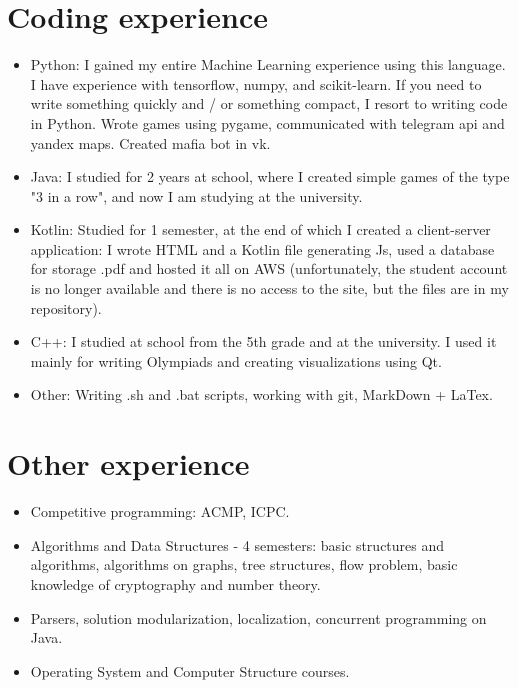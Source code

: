 \documentclass[letter]{deedy-resume}
\begin{document}
    \begin{minipage}[t]{0.6\textwidth}

        \section{Coding experience}

        \begin{itemize}[leftmargin=1em]
            \setlength\itemsep{0em}
            \item Python: I gained my entire Machine Learning experience using this language.
            I have experience with tensorflow, numpy, and scikit-learn.
            If you need to write something quickly and / or something compact, I resort to writing code in Python.
            Wrote games using pygame, communicated with telegram api and yandex maps.
            Created mafia bot in vk.
            \item Java: I studied for 2 years at school, where I created simple games of the type "3 in a row",
            and now I am studying at the university.
            \item Kotlin: Studied for 1 semester, at the end of which I created a client-server application:
            I wrote HTML and a Kotlin file generating Js, used a database for storage .pdf and hosted it all on AWS
            (unfortunately, the student account is no longer available and there is no access to the site,
            but the files are in my repository).
            \item C++: I studied at school from the 5th grade and at the university.
            I used it mainly for writing Olympiads and creating visualizations using Qt.
            \item Other: Writing .sh and .bat scripts, working with git, MarkDown + LaTex.
        \end{itemize}

        \sectionspace %


        \section{Other experience}

        \begin{itemize}[leftmargin=1em]
            \setlength\itemsep{0em}
            \item Competitive programming: ACMP,  ICPC.
            \item Algorithms and Data Structures - 4 semesters: basic structures and algorithms,
            algorithms on graphs, tree structures, flow problem, basic knowledge of cryptography and number theory.
            \item Parsers, solution modularization, localization, concurrent programming on Java.
            \item Operating System and Computer Structure courses.
        \end{itemize}


\end{minipage}
\end{document}
